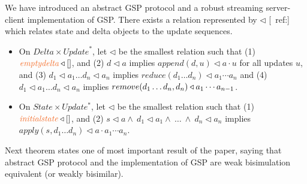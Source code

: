 \documentclass[envcountsect,runningheads,orivec]{llncs}
\begin{document}
We have introduced an abstract GSP protocol and a robust streaming server-client implementation of GSP. There exists a relation represented by $\triangleleft$ [~ref:] which relates state and delta objects to the update sequences. 
\begin{itemize}
	\item On $\mathit{Delta} \times \mathit{Update}^*$, let $\triangleleft$ be the smallest relation such that (1) $\emptydelta \triangleleft []$, and
(2) $d \triangleleft a$ implies $append(d,u) \triangleleft a \cdot u$ for all updates $u$, and (3) $d_1 \triangleleft a_1 \ldots d_n \triangleleft a_n$ implies $reduce(d_1 \ldots d_n) \triangleleft a_1 \cdots a_n$ and (4) $d_1 \triangleleft a_1 \ldots d_n \triangleleft a_n$ implies $remove(d_1 \ldots d_{n}, d_n) \triangleleft a_1 \cdots a_{n-1}$. 
  
\item On $State \times Update^*$, let $\triangleleft$ be the smallest relation such that (1) $\initialstate \triangleleft []$, and
(2) $s \triangleleft a \land \ d_1 \triangleleft a_1 \land \ \ldots \ \land \ d_n \triangleleft a_n$ implies $apply(s,d_1 \ldots d_n) \triangleleft a \cdot a_1 \cdots a_n$.
\end{itemize}

Next theorem states one of most important result of the paper, saying that abstract GSP protocol and the implementation of GSP are weak bisimulation equivalent (or weakly bisimilar). 
\end{document}
